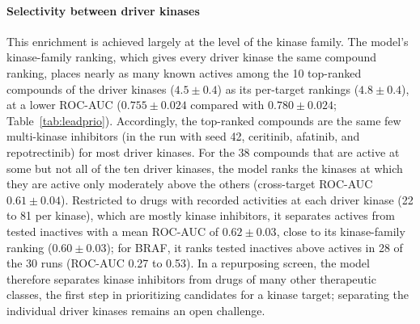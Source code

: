 \documentclass[11pt,letterpaper]{article}
\begin{document}
\paragraph{Selectivity between driver kinases}
This enrichment is achieved largely at the level of the kinase family. The model's kinase-family ranking, which gives every driver kinase the same compound ranking, places nearly as many known actives among the 10 top-ranked compounds of the driver kinases ($4.5\pm0.4$) as its per-target rankings ($4.8\pm0.4$), at a lower ROC-AUC ($0.755\pm0.024$ compared with $0.780\pm0.024$; Table~\ref{tab:leadprio}). Accordingly, the top-ranked compounds are the same few multi-kinase inhibitors (in the run with seed 42, ceritinib, afatinib, and repotrectinib) for most driver kinases. For the 38 compounds that are active at some but not all of the ten driver kinases, the model ranks the kinases at which they are active only moderately above the others (cross-target ROC-AUC $0.61\pm0.04$). Restricted to drugs with recorded activities at each driver kinase (22 to 81 per kinase), which are mostly kinase inhibitors, it separates actives from tested inactives with a mean ROC-AUC of $0.62\pm0.03$, close to its kinase-family ranking ($0.60\pm0.03$); for BRAF, it ranks tested inactives above actives in 28 of the 30 runs (ROC-AUC 0.27 to 0.53). In a repurposing screen, the model therefore separates kinase inhibitors from drugs of many other therapeutic classes, the first step in prioritizing candidates for a kinase target; separating the individual driver kinases remains an open challenge.
\end{document}
